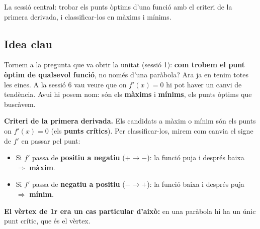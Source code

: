 %
{La sessió central: trobar els punts òptims d'una funció amb el criteri de la primera derivada, i classificar-los en màxims i mínims.}

\subsection{Idea clau}

Tornem a la pregunta que va obrir la unitat (sessió 1): \textbf{com trobem el punt
òptim de qualsevol funció}, no només d'una paràbola? Ara ja en tenim totes les eines. A
la sessió 6 vau veure que on $f'(x)=0$ hi pot haver un canvi de tendència. Avui hi posem
nom: són els \textbf{màxims} i \textbf{mínims}, els punts òptims que buscàvem.

\begin{idea}
\textbf{Criteri de la primera derivada.} Els candidats a màxim o mínim són els punts on
$f'(x)=0$ (els \textbf{punts crítics}). Per classificar-los, mirem com canvia el signe
de $f'$ en passar pel punt:
\begin{itemize}[leftmargin=1.4em, itemsep=3pt]
  \item Si $f'$ passa de \textbf{positiu a negatiu} ($+\to-$): la funció puja i després
        baixa $\Rightarrow$ \textbf{màxim}.
  \item Si $f'$ passa de \textbf{negatiu a positiu} ($-\to+$): la funció baixa i després
        puja $\Rightarrow$ \textbf{mínim}.
\end{itemize}
\textbf{El vèrtex de 1r era un cas particular d'això:} en una paràbola hi ha un únic
punt crític, que és el vèrtex.
\end{idea}

\begin{center}

\end{center}

